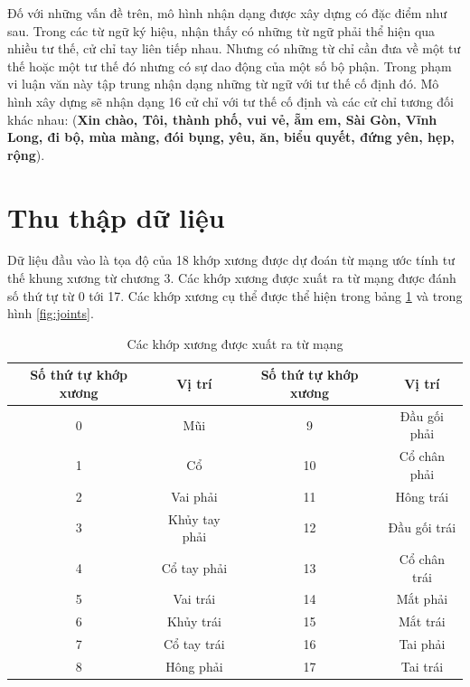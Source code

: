 Đố với những vấn đề trên, mô hình nhận dạng được xây dựng có đặc điểm như sau. Trong các từ ngữ ký hiệu, nhận thấy có những từ ngữ phải thể hiện qua nhiều tư thế, cử chỉ tay liên tiếp nhau. Nhưng có những từ chỉ cần đưa về một tư thế hoặc một tư thế đó nhưng có sự dao động của một số bộ phận. Trong phạm vi luận văn này tập trung nhận dạng những từ ngữ với tư thế cố định đó. Mô hình xây dựng sẽ nhận dạng 16 cử chỉ với tư thế cố định và các cử chỉ tương đối khác nhau: (\textbf{Xin chào, Tôi, thành phố, vui vẻ, ẵm em, Sài Gòn, Vĩnh Long, đi bộ, mùa màng, đói bụng, yêu, ăn, biểu quyết, đứng yên, hẹp, rộng}).

\section{Thu thập dữ liệu}
Dữ liệu đầu vào là tọa độ của 18 khớp xương được dự đoán từ mạng ước tính tư thế khung xương từ chương 3. Các khớp xương được xuất ra từ mạng được đánh số thứ tự từ 0 tới 17. Các khớp xương cụ thể được thể hiện trong bảng \ref{table:joints} và trong hình \ref{fig:joints}.


\begin{table}[h]
\caption{Các khớp xương được xuất ra từ mạng}
\label{table:joints}
\centering
\begin{center}
\begin{tabular}{|c|c||c|c|} 
 \hline
Số thứ tự khớp xương  & Vị trí & Số thứ tự khớp xương & Vị trí\\
 \hline
 0 & Mũi & 9 & Đầu gối phải\\
 \hline 
 1 & Cổ & 10 & Cổ chân phải\\
 \hline 
 2 & Vai phải & 11 & Hông trái\\
 \hline
 3 & Khủy tay phải & 12 & Đầu gối trái \\
 \hline 
 4 & Cổ tay phải & 13 & Cổ chân trái \\
 \hline
 5 & Vai trái & 14 & Mắt phải \\
 \hline
 6 & Khủy trái & 15 & Mắt trái \\
 \hline
 7 & Cổ tay trái & 16 & Tai phải \\
 \hline
 8 & Hông phải & 17 & Tai trái\\
 \hline
\end{tabular}
\end{center}
\end{table}

